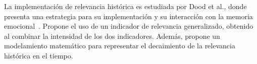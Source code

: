 La implementación de relevancia histórica es estudiada por Dood et al., donde presenta una estrategia para su implementación y su interacción con la memoria emocional~\cite{Dodd2005}. Propone el uso de un indicador de relevancia generalizado, obtenido al combinar la intensidad de los dos indicadores. Además, propone un modelamiento matemático para representar el decaimiento de la relevancia histórica en el tiempo.

